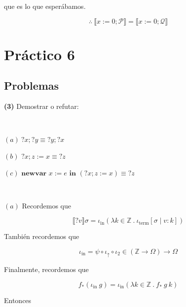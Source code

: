 \documentclass[a4paper, 12pt]{article}
\begin{document}
que es lo que esperábamos.

\begin{equation*}
  \therefore  ~ \llbracket x:=0;\mathcal{P} \rrbracket = \llbracket
  x:=0;\mathcal{Q} \rrbracket
\end{equation*}

\pagebreak 

\section{Práctico 6}


\subsection{Problemas}
\begin{myframe}
  \textbf{(3)} Demostrar o refutar:

  ~

  $(a) ~ ?x; ?y \equiv ?y; ?x$

  $(b)$ $?x;z := x \equiv ? z$ 

  $(c)$ $\textbf{newvar } x := e \textbf{ in } (?x; z := x) \equiv ?z$
\end{myframe}

~

$(a)$ Recordemos que 

\begin{equation}
  \llbracket ?v \rrbracket \sigma = \iota_{\text{in}}\left( \lambda k \in
  \mathbb{Z} ~.~ \iota_{\text{term}} [\sigma \mid v : k] \right) 
\end{equation}

También recordemos que 

\begin{equation*}
  \iota_{\text{in}} = \psi \circ \iota_\uparrow \circ \iota_2 \in (\mathbb{Z}
  \to \Omega) \to \Omega
\end{equation*}

Finalmente, recordemos que 

\begin{equation}
  f_*(\iota_{\text{in}} ~ g) = \iota_{\text{in}} \left( \lambda k \in \mathbb{Z}
  ~ . ~ f_* ~ g ~ k\right) 
\end{equation}

Entonces
\end{document}
